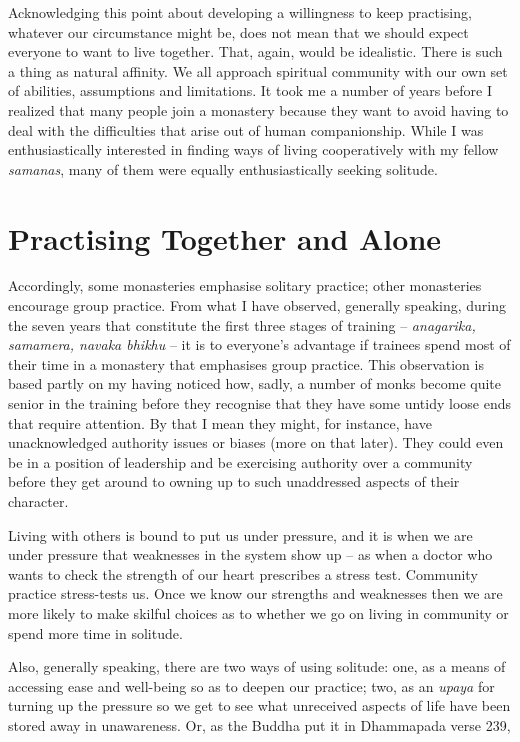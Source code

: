 Acknowledging this point about developing a willingness to keep
practising, whatever our circumstance might be, does not mean that we
should expect everyone to want to live together. That, again, would be
idealistic. There is such a thing as natural affinity. We all approach
spiritual community with our own set of abilities, assumptions and
limitations. It took me a number of years before I realized that many
people join a monastery because they want to avoid having to deal with
the difficulties that arise out of human companionship. While I was
enthusiastically interested in finding ways of living cooperatively with
my fellow \emph{samanas}, many of them were equally enthusiastically
seeking solitude.

\section{Practising Together and Alone}

Accordingly, some monasteries emphasise solitary practice; other
monasteries encourage group practice. From what I have observed,
generally speaking, during the seven years that constitute the first
three stages of training -- \emph{anagarika, samamera, navaka bhikhu} --
it is to everyone's advantage if trainees spend most of their time in a
monastery that emphasises group practice. This observation is based
partly on my having noticed how, sadly, a number of monks become quite
senior in the training before they recognise that they have some untidy
loose ends that require attention. By that I mean they might, for
instance, have unacknowledged authority issues or biases (more on that
later). They could even be in a position of leadership and be exercising
authority over a community before they get around to owning up to such
unaddressed aspects of their character.

Living with others is bound to put us under pressure, and it is when we
are under pressure that weaknesses in the system show up -- as when a
doctor who wants to check the strength of our heart prescribes a stress
test. Community practice stress-tests us. Once we know our strengths and
weaknesses then we are more likely to make skilful choices as to whether
we go on living in community or spend more time in solitude.

Also, generally speaking, there are two ways of using solitude: one, as
a means of accessing ease and well-being so as to deepen our practice;
two, as an \emph{upaya} for turning up the pressure so we get to see
what unreceived aspects of life have been stored away in unawareness.
Or, as the Buddha put it in Dhammapada verse 239,

